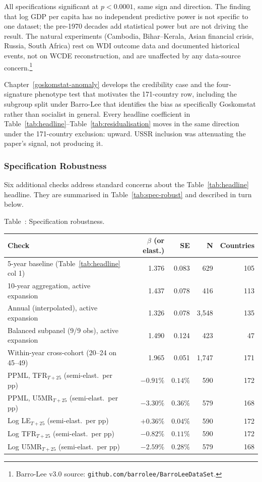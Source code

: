 \documentclass[12pt,letterpaper]{article}
\begin{document}
{All specifications significant at $p < 0.0001$, same sign and
direction. The finding that log GDP per capita has no independent predictive power
is not specific to one dataset; the pre-1970 decades add statistical
power but are not driving the result. The natural experiments
(Cambodia, Bihar--Kerala, Asian financial crisis, Russia, South Africa)
rest on WDI outcome data and documented historical events, not on WCDE
reconstruction, and are unaffected by any data-source
concern.\footnote{Barro-Lee v3.0
source: \texttt{github.com/barrolee/BarroLeeDataSet}.}

Chapter~\ref{goskomstat-anomaly} develops the credibility case and
the four-signature phenotype test that motivates the 171-country
row, including the subgroup split under Barro-Lee that identifies
the bias as specifically Goskomstat rather than socialist in general.
Every headline coefficient in Table~\ref{tab:headline}--Table~\ref{tab:residualisation}
moves in the same direction under the 171-country exclusion: upward.
USSR inclusion was attenuating the paper's signal, not producing
it.

\subsubsection{Specification Robustness}\label{appendix-spec-robust}

Six additional checks address standard concerns about the Table~\ref{tab:headline}
headline. They are summarised in Table~\ref{tab:spec-robust} and described
in turn below.

\label{tab:spec-robust}Table~\thetable: Specification robustness.

{\footnotesize\setlength{\tabcolsep}{3pt}
\begin{longtable}[]{@{}lrrrr@{}}
\toprule
Check & $\beta$ (or elast.) & SE & N & Countries \\
\midrule
\endhead
5-year baseline (Table~\ref{tab:headline} col 1) & 1.376 & 0.083 & 629 & 105 \\
10-year aggregation, active expansion     & 1.437 & 0.078 & 416 & 113 \\
Annual (interpolated), active expansion   & 1.326 & 0.078 & 3{,}548 & 135 \\
Balanced subpanel (9/9 obs), active expansion & 1.490 & 0.124 & 423 & 47 \\
Within-year cross-cohort (20--24 on 45--49) & 1.965 & 0.051 & 1{,}747 & 171 \\
PPML, TFR$_{T+25}$ (semi-elast.\ per pp)   & $-0.91\%$ & $0.14\%$ & 590 & 172 \\
PPML, U5MR$_{T+25}$ (semi-elast.\ per pp)  & $-3.30\%$ & $0.36\%$ & 579 & 168 \\
Log LE$_{T+25}$ (semi-elast.\ per pp)      & $+0.36\%$ & $0.04\%$ & 590 & 172 \\
Log TFR$_{T+25}$ (semi-elast.\ per pp)     & $-0.82\%$ & $0.11\%$ & 590 & 172 \\
Log U5MR$_{T+25}$ (semi-elast.\ per pp)    & $-2.59\%$ & $0.28\%$ & 579 & 168 \\
\bottomrule
\end{longtable}
}

}
\end{document}

